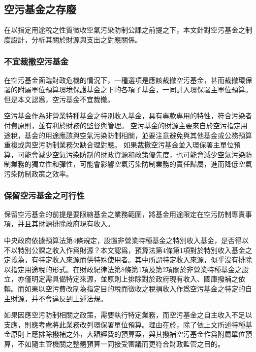 \documentclass[12pt,a4paper]{article}
\begin{document}


\subsection{空污基金之存廢}

在以指定用途稅之性質徵收空氣污染防制公課之前提之下，本文針對空污基金之制度設計，分析其關於財源與支出之對應關係。

\subsubsection{不宜裁撤空污基金}

在空污基金面臨財政危機的情況下，一種選項是應該裁撤空污基金，甚而裁撤環保署的附屬單位預算環境保護基金之下的各項子基金，一同計入環保署主單位預算。但是本文認爲，空污基金不宜裁撤。

空污基金作為非營業特種基金之特別收入基金，具有專款專用的特性，符合污染者付費原則，並有利於財務的監督與管理。
空污基金的財源主要來自於空污指定用途稅，基金的用途應該與空氣污染防制相關，並要注意避免與其他基金或公務預算重複或與空污防制業務欠缺合理對應。
如果裁撤空污基金並入環保署主單位預算，可能會減少空氣污染防制的財政資源和政策優先度，也可能會減少空氣污染防制業務的獨立性和彈性，可能會影響空氣污染防制業務的責任歸屬，進而降低空氣污染防制政策之效率。


\subsubsection{保留空污基金之可行性}

保留空污基金的前提是要限縮基金之業務範圍，將基金用途限定在空污防制專責事項，并且其財源排除政府現有收入。

中央政府依據預算法第4條規定，設置非營業特種基金之特別收入基金，是否得以不以特別公課之收入作爲財源？本文認爲，預算法第4條第1項對於特別收入基金之定義為，有特定收入來源而供特殊使用者。其中所謂特定收入來源，似乎沒有排除以指定用途稅的形式。在財政紀律法第8條第1項及第2項關於非營業特種基金之設立，亦僅明定需具備特定來源，並原則上排除對於政府現有收入、國庫撥補之依賴。而如果以空污費改制為指定目的稅而徵收之稅捐收入作爲空污基金之特定的自主財源，并不會違反到上述法規。

如果因應空污防制相關之政策，需要執行特定業務，而空污基金之自主收入不足以支應，則應考慮將此業務改列環保署單位預算。理由在於，除了依上文所述特種基金原則上應排除撥補之外，大額經費的預算案，與其撥補空污基金作爲附屬單位預算，不如隨主管機關之整體預算一同接受審議而更符合財政監管之目的。
\end{document}
